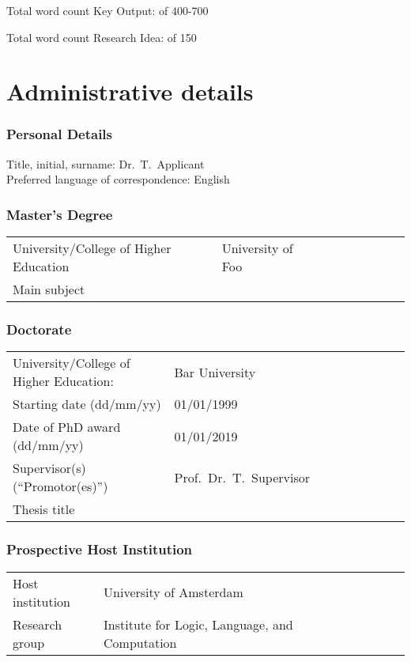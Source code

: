 \documentclass[a4paper,9.5pt,fleqn]{application}
\begin{document}
\ifdefined\haveFirstLit
\vspace{1cm}Total word count \thesection{} Key Output:  of 400-700\\
\fi

\ifdefined\haveAbstract

\vspace{1cm}Total word count \thesection{} Research Idea:  of 150\\
\fi

\ifdefined\haveFirstLit

\newpage
\part{Administrative details}
\section{Personal Details}
Title, initial, surname: Dr.\ T.\ Applicant\\
Preferred language of correspondence: English


\section{Master's Degree}
\begin{tabular}{lllllllll}
University/College of Higher Education& University of Foo\\
Main subject& 
\end{tabular}

\section{Doctorate}
\begin{tabular}{lllllllll}
University/College of Higher Education:& Bar University\\
Starting date (dd/mm/yy)& 01/01/1999\\
Date of PhD award (dd/mm/yy)&   01/01/2019\\
Supervisor(s) (``Promotor(es)'')& Prof.\ Dr.\ T.\ Supervisor\\
Thesis title& 
\end{tabular}

\section{Prospective Host Institution}

\begin{tabular}{lllllllll}
Host institution& University of Amsterdam\\
Research group& Institute for Logic, Language, and Computation
\end{tabular}
\end{document}
